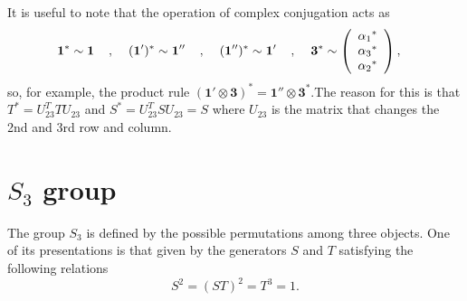\documentclass[a4paper,11pt]{article}
\begin{document}
It is useful to note that the operation of complex conjugation acts as
\begin{equation}
\begin{split}
&{\mathbf{1}}^*\sim\mathbf{1}\hspace{4mm},\hspace{4mm}(\mathbf{1'})^*\sim\mathbf{1''}\hspace{4mm},\hspace{4mm}(\mathbf{1''})^*\sim \mathbf{1'}\hspace{4mm},\hspace{4mm}\mathbf{3}^* \sim \left(\begin{array}{c} {\alpha_1}^* \\ {\alpha_3}^* \\ {\alpha_2}^*\end{array} \right),
\end{split}
\end{equation}
so, for example, the product rule $(\mathbf{1'} \otimes \mathbf{3})^*=\mathbf{1''} \otimes  \mathbf{3}^*$.The reason for this is that $T^*=U^T_{23}TU_{23}$ and $S^*=U^T_{23}SU_{23}=S$ where $U_{23}$ is the matrix that changes the 2nd and 3rd row and column.

\section{$S_3$ group}
\label{app:S3group}

The group $S_3$ is defined by the possible permutations among three objects. One of its presentations is that given by the generators $S$ and $T$ satisfying the following relations 
\begin{equation}
S^2=(ST)^2=T^3=1.
\end{equation}
\end{document}
